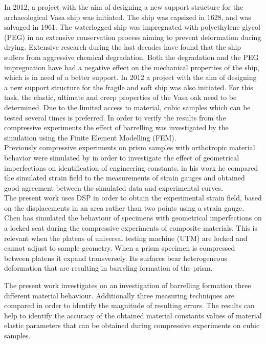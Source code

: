 \documentclass[review]{elsarticle}
\begin{document}
In 2012, a project with the aim of designing a new support structure for the
archaeological Vasa ship was initiated. The ship was capsized in 1628, and was salvaged in 1961. 
The waterlogged ship was impregnated with polyethylene glycol (PEG) in an extensive conservation process aiming to prevent deformation during drying. 
Extensive research during the last decades have found that the ship suffers from
aggressive chemical degradation. Both the degradation \cite{bjurhager2012state}
and the PEG impregnation \cite{ljungdahl2007transverse} have had a negative effect on the mechanical properties of the ship, which is in need of a better support. In 2012 a project with the aim of 
designing a new support structure for the fragile and soft ship was also initiated. For this task, the elastic, ultimate and creep properties of the 
Vasa oak need to be determined. Due to the limited access to material, cubic samples which can be tested several times is preferred.
In order to verify the results from the compressive experiments the effect of
barrelling was investigated by the simulation using the Finite Element
Modelling (FEM).\\
Previously compressive experiments on prism samples with orthotropic material
behavior were simulated by \cite{Toftegaard1999849} in order to investigate the 
effect of geometrical imperfections on identification of engineering constants. 
in his work he compared the simulated strain field to the measurements of strain
gauges and obtained good agreement between the simulated data and experimental
curves.\\
The present work uses DSP in order to obtain the experimental strain field,
based on the displacements in an area rather than two points using a strain
gauge.
Chen \cite{Chen001} has simulated the behaviour of specimens with geometrical
imperfections on a locked  seat during the compressive experiments
of composite materials. This is relevant when the platens of universal testing
machine (UTM) are locked and cannot adjust to sample geometry.
When a prism specimen is compressed between platens it expand transversely.
Its surfaces bear heterogeneous deformation that are resulting in barreling
formation of the prism. 




The present work investigates on an investigation of
barrelling formation three different material behaviour. Additionally three
measuring techniques are compared in order to identify the magnitude of
resulting errors.
The results can help to identify the accuracy of the obtained material constants values
of material elastic parameters that can be obtained during compressive
experiments on cubic samples. 
\end{document}
